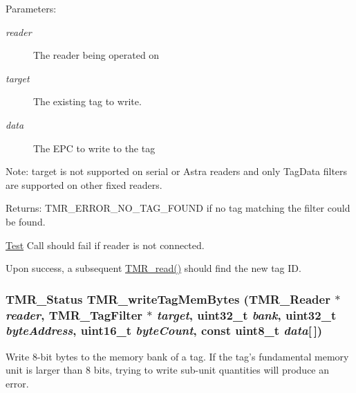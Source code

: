 \begin{Desc}
\item[Parameters:]
\begin{description}
\item[{\em reader}]The reader being operated on \item[{\em target}]The existing tag to write. \item[{\em data}]The EPC to write to the tag \end{description}
\end{Desc}
\begin{Desc}
\item[Note:]target is not supported on serial or Astra readers and only TagData filters are supported on other fixed readers.\end{Desc}
\begin{Desc}
\item[Returns:]TMR\_\-ERROR\_\-NO\_\-TAG\_\-FOUND if no tag matching the filter could be found.\end{Desc}
\begin{Desc}
\item[\hyperlink{test__test000009}{Test}]Call should fail if reader is not connected. 

Upon success, a subsequent \hyperlink{group__reader_gb477ff41498adaa35ca5cae932ecfc70}{TMR\_\-read()} should find the new tag ID. \end{Desc}
\hypertarget{group__reader_g17ea9a96b24e0a6d0c88cce3be33223a}{
\subsubsection[{TMR\_\-writeTagMemBytes}]{\setlength{\rightskip}{0pt plus 5cm}TMR\_\-Status TMR\_\-writeTagMemBytes ({\bf TMR\_\-Reader} $\ast$ {\em reader}, \/  {\bf TMR\_\-TagFilter} $\ast$ {\em target}, \/  uint32\_\-t {\em bank}, \/  uint32\_\-t {\em byteAddress}, \/  uint16\_\-t {\em byteCount}, \/  const uint8\_\-t {\em data}\mbox{[}$\,$\mbox{]})}}
\label{group__reader_g17ea9a96b24e0a6d0c88cce3be33223a}


Write 8-bit bytes to the memory bank of a tag. If the tag's fundamental memory unit is larger than 8 bits, trying to write sub-unit quantities will produce an error.

